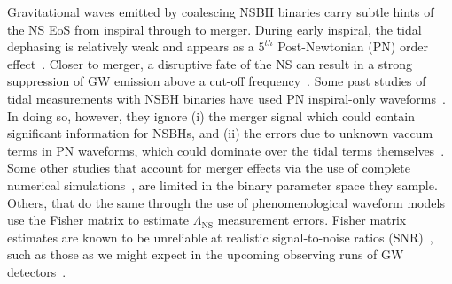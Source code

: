 \documentclass[aps,prd,amsmath,floats,floatfix, twocolumn,
superscriptaddress,nofootinbib,showpacs]{revtex4-1}
\newcommand{\red}{\textcolor{red}}
\newcommand{\lambdans}{\Lambda_\mathrm{NS}}
\begin{document}
% 

Gravitational waves emitted by coalescing NSBH binaries carry subtle hints of
the NS EoS from inspiral through to merger. During early inspiral, the tidal
dephasing is relatively weak and appears as a $5^{th}$ Post-Newtonian (PN)
order effect~\cite{Vines2011}. Closer to merger, a disruptive fate of the NS
can result in a strong suppression of GW emission above a cut-off 
frequency~\cite{Pannarale:2015jia}. Some past studies of tidal measurements
with NSBH binaries have used PN inspiral-only waveforms~\cite{Maselli:2013rza}.
In doing so, however, they ignore (i) the merger signal which could contain significant
information for NSBHs, and (ii) the errors due to unknown vaccum terms in PN 
waveforms, which could dominate over the tidal terms themselves~\cite{Barkett2015,
Yagi:2014}.
% 
Some other studies that account for merger effects via the use of complete
numerical simulations~\cite{Foucart:2013psa}, are limited in the binary
parameter space they sample.
% 
Others, that do the same through the use of phenomenological waveform
models~\cite{Lackey2011,Lackey:2013axa} use the Fisher matrix to estimate
$\lambdans$ measurement errors. Fisher matrix estimates are known to be
unreliable at realistic signal-to-noise ratios (SNR)~\cite{Vallisneri:2007ev},
such as those as we might expect in the upcoming observing runs of GW
detectors~\cite{Abadie:2010cf}.
\end{document}
